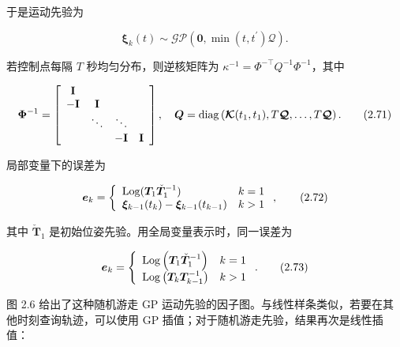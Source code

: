 于是运动先验为

\begin{equation}
\boldsymbol {\xi} _ {k} (t) \sim \mathcal {GP} (\mathbf {0}, \min (t, t ^ {\prime}) \boldsymbol {\mathcal {Q}}).\tag{2.70}
\end{equation}

若控制点每隔 $T$ 秒均匀分布，则逆核矩阵为 $\kappa^{-1}=\Phi^{-\top}Q^{-1}\Phi^{-1}$，其中

\begin{equation}
\boldsymbol {\Phi} ^ {- 1} = \left[ \begin{array}{c c c c} \mathbf {I} & & & \\ - \mathbf {I} & \mathbf {I} & & \\ & \ddots & \ddots & \\ & & - \mathbf {I} & \mathbf {I} \end{array} \right], \quad \boldsymbol {Q} = \operatorname{diag} \left(\boldsymbol {\mathcal {K}} (t _ {1}, t _ {1}), T \boldsymbol {\mathcal {Q}}, \ldots , T \boldsymbol {\mathcal {Q}}\right).\tag{2.71}
\end{equation}

局部变量下的误差为

\begin{equation}
\boldsymbol {e} _ {k} = \left\{ \begin{array}{l l} \mathrm{Log} (\boldsymbol {T} _ {1} \check {\boldsymbol {T}} _ {1} ^ {- 1}) & k = 1 \\ \boldsymbol {\xi} _ {k - 1} (t _ {k}) - \boldsymbol {\xi} _ {k - 1} (t _ {k - 1}) & k > 1 \end{array} \right.,\tag{2.72}
\end{equation}

其中 $\check{\pmb T}_1$ 是初始位姿先验。用全局变量表示时，同一误差为

\begin{equation}
\boldsymbol {e} _ {k} = \left\{ \begin{array}{l l} \operatorname{Log} \left(\boldsymbol {T} _ {1} \check {\boldsymbol {T}} _ {1} ^ {- 1}\right) & k = 1 \\ \operatorname{Log} \left(\boldsymbol {T} _ {k} \boldsymbol {T} _ {k - 1} ^ {- 1}\right) & k > 1 \end{array} \right..\tag{2.73}
\end{equation}

图 2.6 给出了这种随机游走 GP 运动先验的因子图。与线性样条类似，若要在其他时刻查询轨迹，可以使用 GP 插值；对于随机游走先验，结果再次是线性插值：

